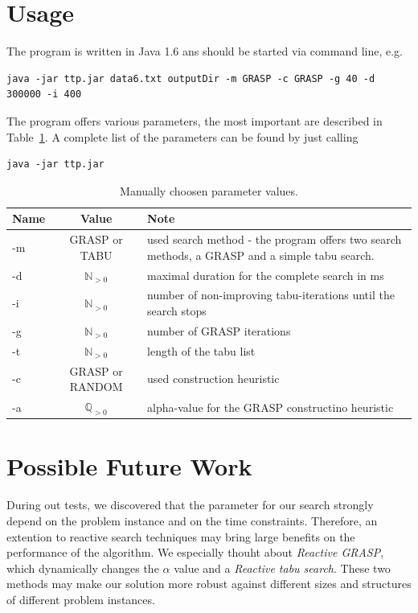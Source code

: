 \documentclass[a4paper,11pt]{article}
\begin{document}
\section{Usage}
The program is written in Java 1.6 ans should be started via command line, e.g.
\small
\lstset{language=sh}
\begin{lstlisting}
java -jar ttp.jar data6.txt outputDir -m GRASP -c GRASP -g 40 -d 300000 -i 400
\end{lstlisting}

The program offers various parameters, the most important are described in Table~\ref{tab:program}. A complete list of the parameters can be found by just calling 
\begin{lstlisting}
java -jar ttp.jar
\end{lstlisting}

\begin{center}
 \begin{table}[htb]
  \begin{tabularx}{\linewidth}{| l | c | X | }
    \hline                       
    Name & Value & Note \\   \hline     \hline    
    -m & GRASP or TABU & used search method - the program offers two search methods, a GRASP and a simple tabu search. \\ \hline    
    -d  & $\mathbb{N}_{ > 0}$ & maximal duration for the complete search in ms \\ \hline    
    -i & $\mathbb{N}_{ > 0}$ & number of non-improving tabu-iterations until the search stops\\ \hline    
    -g & $\mathbb{N}_{ > 0}$ & number of GRASP iterations\\ \hline  
    -t & $\mathbb{N}_{ > 0}$ & length of the tabu list \\ \hline  
    -c & GRASP or RANDOM & used construction heuristic \\ \hline  
    -a & $\mathbb{Q}_{ > 0}$ & alpha-value for the GRASP constructino heuristic \\ \hline  
  \end{tabularx}
    \caption{Manually choosen parameter values.}
  \label{tab:program}
  \end{table}
\end{center}

\section{Possible Future Work}
During out tests, we discovered that the parameter for our search strongly depend on the problem instance and on the time constraints. Therefore, 
an extention to reactive search techniques may bring large benefits on the performance of the algorithm. We especially thouht about \emph{Reactive GRASP},
 which dynamically changes the $\alpha$ value and a \emph{Reactive tabu search}. These two methods may make our solution more robust against different 
sizes and structures of different problem instances.
\end{document}
